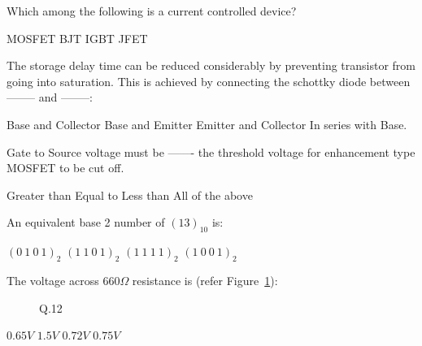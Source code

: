 \documentclass[a4, 12pt, addpoints]{exam}
\begin{document}
\begin{questions}
\begin{oneparchoices}
\end{oneparchoices} 
\question Which among the following is a current controlled device?\\[0.3cm]
\begin{oneparchoices}
\choice MOSFET
\choice BJT
\choice IGBT
\choice JFET
\end{oneparchoices} 
\question The storage delay time can be reduced considerably by preventing transistor from going into saturation. This is achieved by connecting the schottky diode between -------- and --------:\\[0.3cm]
\begin{oneparchoices}
\choice Base and Collector
\choice Base and Emitter
\choice Emitter and Collector
\choice In series with Base. 
\end{oneparchoices}  
\question Gate to Source voltage must be ------- the threshold voltage for enhancement type MOSFET to be cut off.\\[0.3cm]
\begin{oneparchoices}
\choice Greater than
\choice Equal to
\choice Less than
\choice All of the above
\end{oneparchoices}  
\question An equivalent base 2 number of $(13)_{10}$ is:\\[0.3cm]
\begin{oneparchoices}
\choice $(0~1~0~1)_2$ 
\choice $(1~1~0~1)_2$
\choice $(1~1~1~1)_2$
\choice $(1~0~0~1)_2$
\end{oneparchoices} 
\question The voltage across $660 \Omega$ resistance is (refer Figure~\ref{fig:2}):
\begin{figure}[H]
\centering
{}
\caption{Q.12}
\label{fig:2}
\end{figure}
\begin{oneparchoices}
    \choice $0.65 V$
    \choice $1.5 V$
    \choice $0.72 V$
    \CorrectChoice $0.75 V$
    

\end{oneparchoices}
\end{questions}
\end{document}

